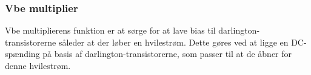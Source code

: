 \subsubsection*{Vbe multiplier}

Vbe multiplierens funktion er at sørge for at lave bias til darlington-transistorerne såleder at der løber en hvilestrøm. Dette gøres ved at ligge en DC-spænding på basis af darlington-transistorerne, som passer til at de åbner for denne hvilestrøm. 